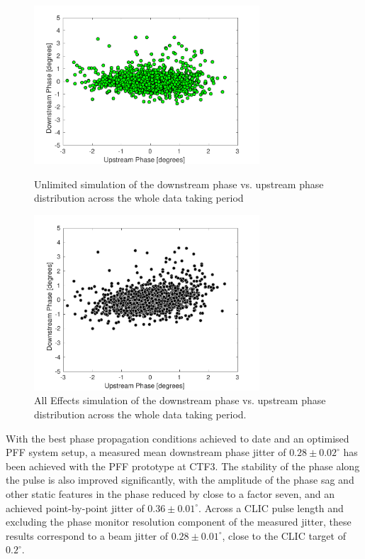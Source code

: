 \begin{figure}
  \centering
  \includegraphics[width=0.75\textwidth]{Figures/feedforward/longFF_scatterFFSimOpt}
  \caption{Unlimited simulation of the downstream phase vs. upstream phase distribution across the whole data taking period}
  \label{f:longFF_scatterFFSimOpt}

  \includegraphics[width=0.75\textwidth]{Figures/feedforward/longFF_scatterFFSimReal}
  \caption{All Effects simulation of the downstream phase vs. upstream phase distribution across the whole data taking period.}
  \label{f:longFF_scatterFFSimReal}
\end{figure}

\FloatBarrier


With the best phase propagation conditions achieved to date and an optimised PFF system setup, a measured mean downstream phase jitter of \(0.28\pm0.02^\circ\) has been achieved with the PFF prototype at CTF3. The stability of the phase along the pulse is also improved significantly, with the amplitude of the phase sag and other static features in the phase reduced by close to a factor seven, and an achieved point-by-point jitter of \(0.36\pm0.01^\circ\). Across a CLIC pulse length and excluding the phase monitor resolution component of the measured jitter, these results correspond to a beam jitter of \(0.28\pm0.01^\circ\), close to the CLIC target of \(0.2^\circ\).

